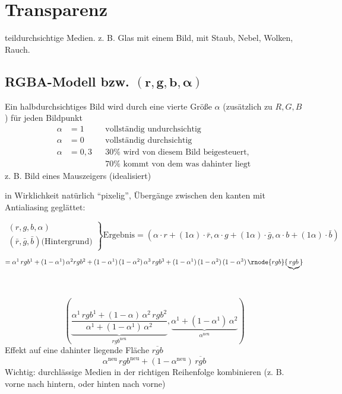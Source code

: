 \section{Transparenz}
\begin{center}
\end{center}
teildurchsichtige Medien. z. B. Glas mit einem Bild, mit Staub, Nebel, Wolken, Rauch.

\subsection{RGBA-Modell bzw. $\boldsymbol{(r, g, b, \alpha)}$}
Ein halbdurchsichtiges Bild wird durch eine vierte Größe $\alpha$ (zusätzlich zu $R, G, B$) für jeden Bildpunkt
\begin{align*}
 \alpha &= 1 & &\text{vollständig undurchsichtig}\\
 \alpha &= 0 & &\text{vollständig durchsichtig}\\
 \alpha &= 0{,3} & &\text{$30\%$ wird von diesem Bild beigesteuert, }\\
	&	& &\text{$70\%$ kommt von dem was dahinter liegt}
\end{align*}
z. B. Bild eines Mauszeigers (idealisiert)
\begin{center}
\end{center}
in Wirklichkeit natürlich "`pixelig"', Übergänge zwischen den kanten mit Antialiasing geglättet:
\begin{center}
\end{center}
\[
\left.
 \begin{array}{r}
  (r,g,b,\alpha)\\
 (\bar r, \bar g, \bar b) \text{(Hintergrund)}
  \end{array}\right\} \text{Ergebnis} = (\alpha \cdot r + (1 \alpha)\cdot \bar r,
					\alpha \cdot g + (1 \alpha)\cdot \bar g,
					\alpha \cdot b + (1 \alpha)\cdot \bar b)
\]
\begin{center}
\end{center}
 $= \alpha^1\,rgb^1 + (1 - \alpha^1)\,\alpha^2rgb^2 + (1-\alpha^1)\,(1-\alpha^2)\,\alpha^3\,rgb^3
	+ (1-\alpha^1)\,(1-\alpha^2)\,(1-\alpha^3)\,\rnode{rgb}{\underbrace{rgb}}$
	\begin{center}
	  \hspace{5cm} \\[1em]
	\end{center}
	\[\left(\underbrace{\frac{\alpha^1\,rgb^1 + (1 - \alpha)\,\alpha^2\,rgb^2}{\alpha^1 + (1-\alpha^1)\,\alpha^2}}_
		{rgb^\mathrm{neu}}, \underbrace{\alpha^1 + (1-\alpha^1)\,\alpha^2}_{\alpha^\mathrm{neu}}\right)\]
		Effekt auf eine dahinter liegende Fläche $\overline{rgb}$
		\[\alpha^\mathrm{neu} \, rgb^\mathrm{neu} + (1-\alpha^\mathrm{neu})\,\overline{rgb}\]
Wichtig: durchlässige Medien in der richtigen Reihenfolge kombinieren (z. B. vorne nach hintern, oder hinten nach vorne)

